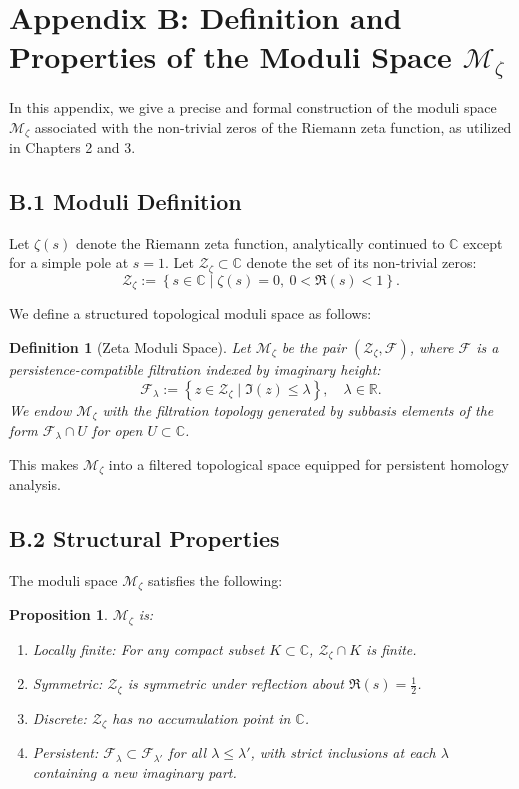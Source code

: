 \documentclass[11pt]{article}
\newtheorem{definition}[theorem]{Definition}
\newtheorem{proposition}[theorem]{Proposition}
\begin{document}
\section*{Appendix B: Definition and Properties of the Moduli Space $\mathcal{M}_\zeta$}

In this appendix, we give a precise and formal construction of the moduli space $\mathcal{M}_\zeta$  
associated with the non-trivial zeros of the Riemann zeta function, as utilized in Chapters 2 and 3.

\subsection*{B.1 Moduli Definition}

Let $\zeta(s)$ denote the Riemann zeta function, analytically continued to $\mathbb{C}$ except for a simple pole at $s = 1$.  
Let $\mathcal{Z}_\zeta \subset \mathbb{C}$ denote the set of its non-trivial zeros:
\[
\mathcal{Z}_\zeta := \left\{ s \in \mathbb{C} \mid \zeta(s) = 0,\ 0 < \Re(s) < 1 \right\}.
\]

We define a structured topological moduli space as follows:

\begin{definition}[Zeta Moduli Space]
Let $\mathcal{M}_\zeta$ be the pair $(\mathcal{Z}_\zeta, \mathcal{F})$, where $\mathcal{F}$ is a persistence-compatible filtration  
indexed by imaginary height:
\[
\mathcal{F}_\lambda := \left\{ z \in \mathcal{Z}_\zeta \mid \Im(z) \leq \lambda \right\}, \quad \lambda \in \mathbb{R}.
\]
We endow $\mathcal{M}_\zeta$ with the filtration topology generated by subbasis elements of the form $\mathcal{F}_\lambda \cap U$  
for open $U \subset \mathbb{C}$.
\end{definition}

This makes $\mathcal{M}_\zeta$ into a filtered topological space equipped for persistent homology analysis.

\subsection*{B.2 Structural Properties}

The moduli space $\mathcal{M}_\zeta$ satisfies the following:

\begin{proposition}
$\mathcal{M}_\zeta$ is:
\begin{enumerate}
    \item Locally finite: For any compact subset $K \subset \mathbb{C}$, $\mathcal{Z}_\zeta \cap K$ is finite.
    \item Symmetric: $\mathcal{Z}_\zeta$ is symmetric under reflection about $\Re(s) = \tfrac{1}{2}$.
    \item Discrete: $\mathcal{Z}_\zeta$ has no accumulation point in $\mathbb{C}$.
    \item Persistent: $\mathcal{F}_\lambda \subset \mathcal{F}_{\lambda'}$ for all $\lambda \leq \lambda'$,  
    with strict inclusions at each $\lambda$ containing a new imaginary part.
\end{enumerate}
\end{proposition}
\end{document}

